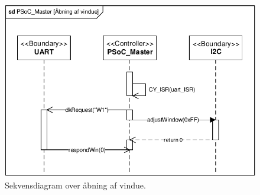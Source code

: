 \begin{figure}[h]
\centering
\includegraphics[scale=1]{../fig/sd_PSoC_master_open_window}
\caption{Sekvensdiagram over åbning af vindue.}
\label{fig:sd_PSoC_master_window}
\end{figure}

\clearpage